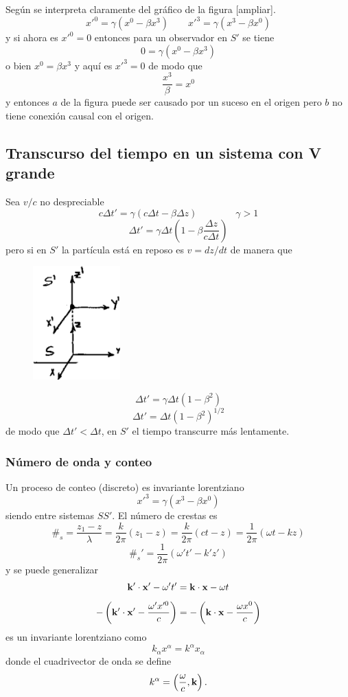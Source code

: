 \documentclass[10pt,oneside]{CBFT_book}
\begin{document}
Según se interpreta claramente del gráfico de la figura [ampliar].
\[
	x'^0 = \gamma (x^0 - \beta x^3) \qquad x'^3 = \gamma (x^3 - \beta x^0)
\]
y si ahora es $x'^0 = 0$ entonces para un observador en $S'$ se tiene 
\[
	0 = \gamma (x^0 - \beta x^3) 
\]
o bien $x^0 = \beta x^3$ y aquí es $x'^3 = 0$ de modo que 
\[
	\frac{x^3}{\beta} = x^0
\]
y entonces $a$ de la figura puede ser causado por un suceso en el origen pero $b$ no tiene 
conexión causal con el origen.

\subsection{Transcurso del tiempo en un sistema con V grande}

Sea $v/c$ no despreciable 
\[
	c \Delta t' = \gamma ( c\Delta t - \beta \Delta z) \qquad \qquad \gamma >1
\]
\[
	\Delta t' = \gamma \Delta t \left( 1 - \beta \frac{\Delta z}{c\Delta t} \right)
\]
pero si en $S'$ la partícula está en reposo es $v = dz/dt $ de manera que 
\begin{figure}[htb]
	\begin{center}
	\includegraphics[width=0.3\textwidth]{images/fig_ft1_vgrande.pdf}	 
	\end{center}
	\caption{}
\end{figure} 
\[
	\Delta t' = \gamma \Delta t ( 1 - \beta^2)
\]
\[
	\Delta t' = \Delta t ( 1 - \beta^2)^{1/2}
\]
de modo que $ \Delta t' < \Delta t$, en $S'$ el tiempo transcurre más lentamente.

\subsubsection{Número de onda y conteo}

Un proceso de conteo (discreto) es invariante lorentziano
\[
	x'^3 = \gamma ( x^3 - \beta x^0 )
\]
siendo  entre sistemas $SS'$.
El número de crestas es 
\[
	\#_s = \frac{ z_1 - z }{ \lambda } = \frac{ k }{ 2\pi }( z_1 - z ) = \frac{ k }{ 2\pi }( ct - z ) = 
	\frac{ 1 }{ 2\pi }( \omega t - kz )
\]
\[
	\#_s' = \frac{ 1 }{ 2\pi }( \omega' t' - k'z' )
\]
y se puede generalizar
\[
	\pe{k'}{x'} - \omega' t' = \pe{k}{x} - \omega t
\]
\[
	-\left( \pe{k'}{x'} - \frac{\omega' x'^0 }{c} \right) = -\left( \pe{k}{x} - \frac{\omega x^0 }{c}  
\right)
\]
es un invariante lorentziano como
\[
	k_\alpha x^\alpha = k^\alpha x_\alpha
\]
donde el cuadrivector de onda se define
\[
	k^\alpha = \left( \frac{\omega}{c}, \vb{k}\right).
\]
\end{document}
